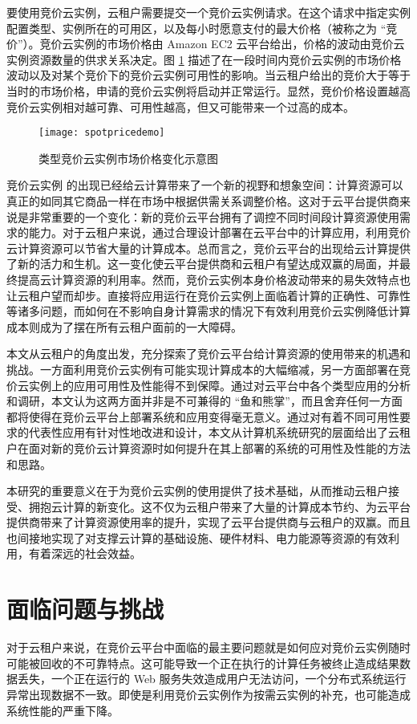 要使用竞价云实例，云租户需要提交一个竞价云实例请求。在这个请求中指定实例配置类型、实例所在的可用区，以及每小时愿意支付的最大价格（被称之为 ``竞价''）。竞价云实例的市场价格由 Amazon EC2 云平台给出，价格的波动由竞价云实例资源数量的供求关系决定。图 \ref{figure:spdemo} 描述了在一段时间内竞价云实例的市场价格波动以及对某个竞价下的竞价云实例可用性的影响。当云租户给出的竞价大于等于当时的市场价格，申请的竞价云实例将启动并正常运行。显然，竞价价格设置越高竞价云实例相对越可靠、可用性越高，但又可能带来一个过高的成本。
\begin{figure}
  \centering
  \texttt{[image: spotpricedemo]}
  \caption{类型竞价云实例市场价格变化示意图}
  \label{figure:spdemo}
\end{figure}

竞价云实例 \cite{SI:2014} 的出现已经给云计算带来了一个新的视野和想象空间：计算资源可以真正的如同其它商品一样在市场中根据供需关系调整价格。这对于云平台提供商来说是非常重要的一个变化：新的竞价云平台拥有了调控不同时间段计算资源使用需求的能力。对于云租户来说，通过合理设计部署在云平台中的计算应用，利用竞价云计算资源可以节省大量的计算成本。总而言之，竞价云平台的出现给云计算提供了新的活力和生机。这一变化使云平台提供商和云租户有望达成双赢的局面，并最终提高云计算资源的利用率。然而，竞价云实例本身价格波动带来的易失效特点也让云租户望而却步。直接将应用运行在竞价云实例上面临着计算的正确性、可靠性等诸多问题，而如何在不影响自身计算需求的情况下有效利用竞价云实例降低计算成本则成为了摆在所有云租户面前的一大障碍。

本文从云租户的角度出发，充分探索了竞价云平台给计算资源的使用带来的机遇和挑战。一方面利用竞价云实例有可能实现计算成本的大幅缩减，另一方面部署在竞价云实例上的应用可用性及性能得不到保障。通过对云平台中各个类型应用的分析和调研，本文认为这两方面并非是不可兼得的 ``鱼和熊掌''，而且舍弃任何一方面都将使得在竞价云平台上部署系统和应用变得毫无意义。通过对有着不同可用性要求的代表性应用有针对性地改进和设计，本文从计算机系统研究的层面给出了云租户在面对新的竞价云计算资源时如何提升在其上部署的系统的可用性及性能的方法和思路。

本研究的重要意义在于为竞价云实例的使用提供了技术基础，从而推动云租户接受、拥抱云计算的新变化。这不仅为云租户带来了大量的计算成本节约、为云平台提供商带来了计算资源使用率的提升，实现了云平台提供商与云租户的双赢。而且也间接地实现了对支撑云计算的基础设施、硬件材料、电力能源等资源的有效利用，有着深远的社会效益。

\section{面临问题与挑战}
对于云租户来说，在竞价云平台中面临的最主要问题就是如何应对竞价云实例随时可能被回收的不可靠特点。这可能导致一个正在执行的计算任务被终止造成结果数据丢失，一个正在运行的 Web 服务失效造成用户无法访问，一个分布式系统运行异常出现数据不一致。即使是利用竞价云实例作为按需云实例的补充，也可能造成系统性能的严重下降。

